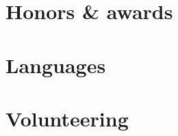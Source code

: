 \documentclass[]{template}
\begin{document}

\newpage
\section{Honors \& awards}
\sectionsep


\section{Languages}
\sectionsep


\section{Volunteering}
\end{document}
